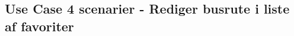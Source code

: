 \documentclass[main]{subfiles}
\begin{document}
\subsection{Use Case 4 scenarier - Rediger busrute i liste af favoriter}
\end{document}

